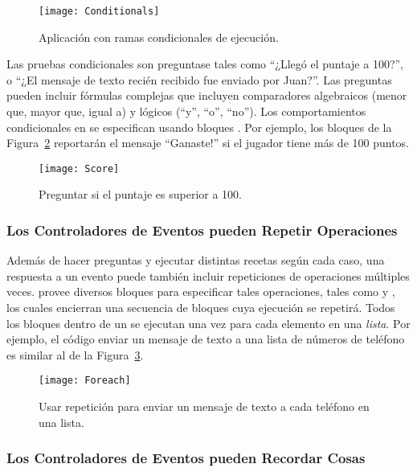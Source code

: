 \begin{figure}[H]
  \centering
  \texttt{[image: Conditionals]}
  \caption{Aplicación con ramas condicionales de ejecución.}
  \label{fig:conditionals}
\end{figure}

Las pruebas condicionales son preguntase tales como ``¿Llegó el puntaje a 100?'', o ``¿El mensaje de texto recién recibido fue enviado por Juan?''.  Las preguntas pueden incluir fórmulas complejas que incluyen comparadores algebraicos (menor que, mayor que, igual a) y lógicos (“y”, “o”, “no”). Los comportamientos condicionales en \AppInventor se especifican usando bloques . Por ejemplo, los bloques de la Figura~\ref{fig:score} reportarán el mensaje ``Ganaste!'' si el jugador tiene más de 100 puntos.

\begin{figure}[H]
  \centering
  \texttt{[image: Score]}
  \caption{Preguntar si el puntaje es superior a 100.}
  \label{fig:score}
\end{figure}

\subsubsection*{Los Controladores de Eventos pueden Repetir Operaciones}
Además de hacer preguntas y ejecutar distintas recetas según cada caso, una respuesta a un evento puede también incluir repeticiones de operaciones múltiples veces. \AppInventor provee diversos bloques para especificar tales operaciones, tales como  y , los cuales encierran una secuencia de bloques cuya ejecución se repetirá. Todos los bloques dentro de un  se ejecutan una vez para cada elemento en una \emph{lista}. Por ejemplo, el código enviar un mensaje de texto a una lista de números de teléfono es similar al de la Figura~\ref{fig:foreach}.

\begin{figure}[H]
  \centering
  \texttt{[image: Foreach]}
  \caption{Usar repetición para enviar un mensaje de texto a cada teléfono en una lista.}
  \label{fig:foreach}
\end{figure}

\subsubsection*{Los Controladores de Eventos pueden Recordar Cosas}

